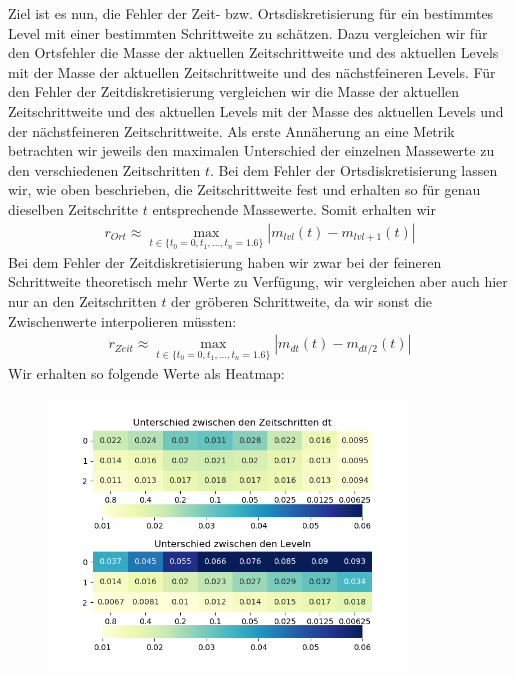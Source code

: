 Ziel ist es nun, die Fehler der Zeit- bzw. Ortsdiskretisierung für ein bestimmtes Level mit einer bestimmten Schrittweite zu schätzen. 
Dazu vergleichen wir für den Ortsfehler die Masse der aktuellen Zeitschrittweite und des aktuellen Levels mit der Masse der aktuellen Zeitschrittweite und des nächstfeineren Levels.
Für den Fehler der Zeitdiskretisierung vergleichen wir die Masse der aktuellen Zeitschrittweite und des aktuellen Levels mit der Masse des aktuellen Levels und der nächstfeineren Zeitschrittweite.
Als erste Annäherung an eine Metrik betrachten wir jeweils den maximalen Unterschied der einzelnen Massewerte zu den verschiedenen Zeitschritten $t$.
Bei dem Fehler der Ortsdiskretisierung lassen wir, wie oben beschrieben, die Zeitschrittweite fest und erhalten so für genau dieselben Zeitschritte $t$ entsprechende Massewerte. Somit erhalten wir 
\begin{align*}
	r_{Ort}  \approx \max_{t \in \{t_0 = 0,t_1,...,t_n=1.6 \}  } |m_{lvl}(t) - m_{lvl + 1} (t) |
\end{align*}
Bei dem Fehler der Zeitdiskretisierung haben wir zwar bei der feineren Schrittweite theoretisch mehr Werte zu Verfügung, wir vergleichen aber auch hier nur an den Zeitschritten $t$ der gröberen Schrittweite, da wir sonst die Zwischenwerte interpolieren müssten:
\begin{align*}
r_{Zeit}  \approx \max_{t \in \{t_0 = 0,t_1,...,t_n=1.6 \}  } |m_{dt}(t) - m_{dt/2} (t) |
\end{align*}
Wir erhalten so folgende Werte als Heatmap:
\begin{figure}[H]
	\centering
	\includegraphics[width=0.85\textwidth]{../Aufgabe31/Maxdiff/Heatmapblub.png}
\end{figure}
